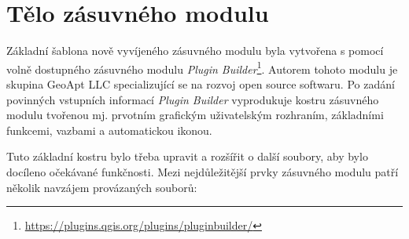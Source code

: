\begin{enumerate}

\end{enumerate}

\section{Tělo zásuvného modulu}

Základní šablona nově vyvíjeného zásuvného modulu byla vytvořena s
pomocí volně dostupného zásuvného modulu \textit{Plugin
  Builder}\footnote{\url{https://plugins.qgis.org/plugins/pluginbuilder/}}. Autorem
tohoto modulu je skupina GeoApt LLC specializující se na rozvoj open
source softwaru. Po zadání povinných vstupních informací
\textit{Plugin Builder} vyprodukuje kostru zásuvného modulu tvořenou
mj. prvotním grafickým uživatelským rozhraním, základními funkcemi,
vazbami a automatickou ikonou.

Tuto základní kostru bylo třeba upravit a rozšířit o další soubory,
aby bylo docíleno očekávané funkčnosti. Mezi nejdůležitější prvky
zásuvného modulu patří několik navzájem provázaných souborů:

